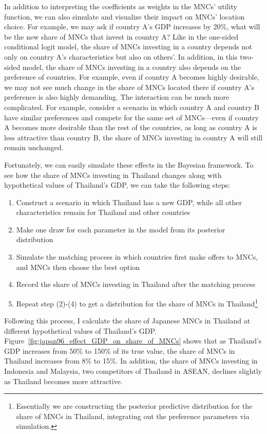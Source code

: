In addition to interpreting the coefficients as weights in the MNCs' utility
function, we can also simulate and visualize their impact on MNCs' location
choice. For example, we may ask if country A's GDP increases by 20\%, what will
be the new share of MNCs that invest in country A? Like in the one-sided
conditional logit model, the share of MNCs investing in a country depends not
only on country A's characteristics but also on others'. In addition, in this
two-sided model, the share of MNCs investing in a country also depends on the
preference of countries. For example, even if country A becomes highly
desirable, we may not see much change in the share of MNCs located there if
country A's preference is also highly demanding. The interaction can be much
more complicated. For example, consider a scenario in which country A and
country B have similar preferences and compete for the same set of MNCs---even
if country A becomes more desirable than the rest of the countries, as long as
country A is less attractive than country B, the share of MNCs investing in
country A will still remain unchanged.

Fortunately, we can easily simulate these effects in the Bayesian framework. To
see how the share of MNCs investing in Thailand changes along with hypothetical
values of Thailand's GDP, we can take the following steps:

\begin{enumerate}
  \item Construct a scenario in which Thailand has a new GDP, while all other
    characteristics remain for Thailand and other countries
  \item Make one draw for each parameter in the model from its posterior
    distribution
  \item Simulate the matching process in which countries first make offers to
    MNCs, and MNCs then choose the best option
  \item Record the share of MNCs investing in Thailand after the matching process
  \item Repeat step (2)-(4) to get a distribution for the share of MNCs in
    Thailand\footnote{Essentially we are constructing the posterior predictive
      distribution for the share of MNCs in Thailand, integrating out the
      preference parameters via simulation.}
\end{enumerate}

Following this process, I calculate the share of Japanese MNCs in Thailand at
different hypothetical values of Thailand's GDP.
Figure~\ref{fig:japan96_effect_GDP_on_share_of_MNCs} shows that as Thailand's
GDP increases from 50\% to 150\% of its true value, the share of MNCs in
Thailand increases from 8\% to 15\%. In addition, the share of MNCs
investing in Indonesia and Malaysia, two competitors of Thailand in ASEAN,
declines slightly as Thailand becomes more attractive. 

